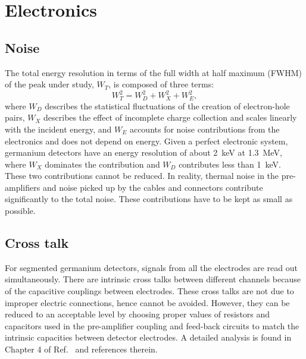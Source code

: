 \section{Electronics}
\label{sec:det:elec}

\subsection{Noise}
\label{sec:det:noise}
The total energy resolution in terms of the full width at half maximum
(FWHM) of the peak under study, $W_{T}$, is composed of three terms:
\begin{equation}
W_{T}^{2} = W_{D}^{2} + W_{X}^{2} + W_{E}^{2},
\end{equation}
where $W_{D}$ describes the statistical fluctuations of the creation of electron-hole pairs, $W_{X}$ describes the effect of incomplete charge collection and scales linearly with the incident energy, and $W_{E}$ accounts for noise contributions from the electronics and does not depend on energy. Given a perfect electronic system, germanium detectors have an energy resolution of about 2~keV at 1.3~MeV, where $W_{X}$ dominates the contribution and $W_{D}$ contributes less than 1~keV. These two contributions cannot be reduced. In reality, thermal noise in the pre-amplifiers and noise picked up by the cables and connectors contribute significantly to the total noise. These contributions have to be kept as small as possible.

\subsection{Cross talk}
\label{sec:det:xtalk}
For segmented germanium detectors, signals from all the electrodes are read out simultaneously. There are intrinsic cross talks between different channels because of the capacitive couplings between electrodes. These cross talks are not due to improper electric connections, hence cannot be avoided. However, they can be reduced to an acceptable level by choosing proper values of resistors and capacitors used in the pre-amplifier coupling and feed-back circuits to match the intrinsic capacities between detector electrodes. A detailed analysis is found in Chapter 4 of Ref.~\cite{Bru06} and references therein.



